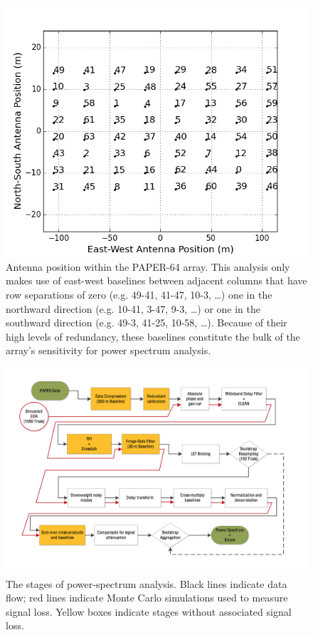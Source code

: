 \documentclass[twocolumn,numberedappendix]{emulateapj} \shorttitle{PSA64}
\begin{document}
\begin{figure}\centering
\includegraphics[width=\columnwidth]{plots/antenna_positions.png}
\caption{
Antenna position within the PAPER-64 array.
This analysis only makes use of
east-west baselines between adjacent columns that have row
separations of zero (e.g. 49-41, 41-47, 10-3, \dots)
one in the northward direction (e.g. 10-41, 3-47, 9-3, \dots) or
one in the southward direction (e.g. 49-3, 41-25, 10-58, \dots).
Because of their high levels of redundancy, 
these baselines constitute the bulk of the array's sensitivity for power
spectrum analysis.}
\label{fig:antenna_positions}
\end{figure}

\begin{figure}
\includegraphics[width=2\columnwidth]{plots/data_flow_chart.png}
\caption
{
The stages of power-spectrum analysis. Black lines indicate data flow; red lines indicate
Monte Carlo simulations used to 
measure signal loss. Yellow boxes indicate stages without associated signal loss.
}
\label{fig:flowchart}
\end{figure}
\end{document}
